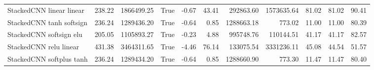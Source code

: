 \begin{tabular}{lrrlrrrrrrr}
StackedCNN linear linear & 238.22 & 1866499.25 & True & -0.67 & 43.41 & 292863.60 & 1573635.64 & 81.02 & 81.02 & 90.41 \\
StackedCNN tanh softsign & 236.24 & 1289436.20 & True & -0.64 & 0.85 & 1288663.18 & 773.02 & 11.00 & 11.00 & 80.39 \\
StackedCNN softsign elu & 205.05 & 1105893.27 & True & -0.23 & 4.88 & 995748.76 & 110144.51 & 41.17 & 41.17 & 82.57 \\
StackedCNN relu linear & 431.38 & 3464311.65 & True & -4.46 & 76.14 & 133075.54 & 3331236.11 & 45.08 & 44.54 & 51.57 \\
StackedCNN softplus tanh & 236.24 & 1289434.20 & True & -0.64 & 0.85 & 1288660.90 & 773.30 & 11.47 & 11.47 & 80.40 \\
\bottomrule
\end{tabular}
